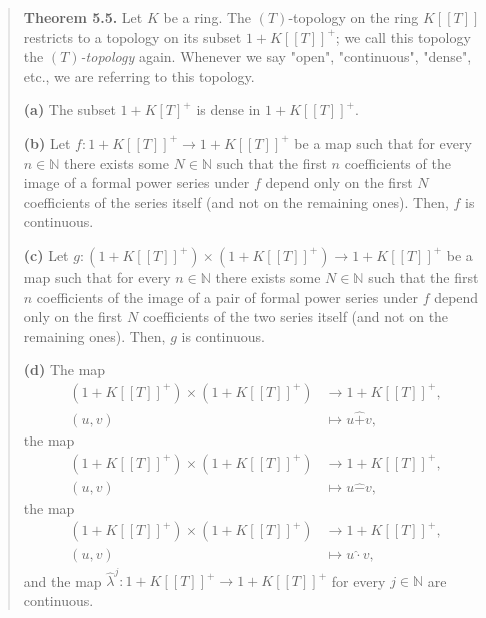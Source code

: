 \documentclass[12pt,final,notitlepage,onecolumn,german]{article}%
\begin{document}
\begin{quote}
\textbf{Theorem 5.5.} Let $K$ be a ring. The $\left(  T\right)  $-topology on
the ring $K\left[  \left[  T\right]  \right]  $ restricts to a topology on its
subset $1+K\left[  \left[  T\right]  \right]  ^{+}$; we call this topology the
$\left(  T\right)  $\textit{-topology} again. Whenever we say "open",
"continuous", "dense", etc., we are referring to this topology.

\textbf{(a)} The subset $1+K\left[  T\right]  ^{+}$ is dense in $1+K\left[
\left[  T\right]  \right]  ^{+}$.

\textbf{(b)} Let $f:1+K\left[  \left[  T\right]  \right]  ^{+}\rightarrow
1+K\left[  \left[  T\right]  \right]  ^{+}$ be a map such that for every
$n\in\mathbb{N}$ there exists some $N\in\mathbb{N}$ such that the first $n$
coefficients of the image of a formal power series under $f$ depend only on
the first $N$ coefficients of the series itself (and not on the remaining
ones). Then, $f$ is continuous.

\textbf{(c)} Let $g:\left(  1+K\left[  \left[  T\right]  \right]  ^{+}\right)
\times\left(  1+K\left[  \left[  T\right]  \right]  ^{+}\right)
\rightarrow1+K\left[  \left[  T\right]  \right]  ^{+}$ be a map such that for
every $n\in\mathbb{N}$ there exists some $N\in\mathbb{N}$ such that the first
$n$ coefficients of the image of a pair of formal power series under $f$
depend only on the first $N$ coefficients of the two series itself (and not on
the remaining ones). Then, $g$ is continuous.

\textbf{(d)} The map%
\begin{align*}
\left(  1+K\left[  \left[  T\right]  \right]  ^{+}\right)  \times\left(
1+K\left[  \left[  T\right]  \right]  ^{+}\right)   &  \rightarrow1+K\left[
\left[  T\right]  \right]  ^{+},\\
\left(  u,v\right)   &  \mapsto u\widehat{+}v,
\end{align*}
the map%
\begin{align*}
\left(  1+K\left[  \left[  T\right]  \right]  ^{+}\right)  \times\left(
1+K\left[  \left[  T\right]  \right]  ^{+}\right)   &  \rightarrow1+K\left[
\left[  T\right]  \right]  ^{+},\\
\left(  u,v\right)   &  \mapsto u\widehat{-}v,
\end{align*}
the map%
\begin{align*}
\left(  1+K\left[  \left[  T\right]  \right]  ^{+}\right)  \times\left(
1+K\left[  \left[  T\right]  \right]  ^{+}\right)   &  \rightarrow1+K\left[
\left[  T\right]  \right]  ^{+},\\
\left(  u,v\right)   &  \mapsto u\widehat{\cdot}v,
\end{align*}
and the map $\widehat{\lambda}^{j}:1+K\left[  \left[  T\right]  \right]
^{+}\rightarrow1+K\left[  \left[  T\right]  \right]  ^{+}$ for every
$j\in\mathbb{N}$ are continuous.
\end{quote}
\end{document}
